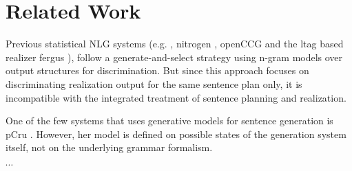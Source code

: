 \section{Related Work}
\label{sec:related}


Previous statistical NLG systems (e.g. , {\sc nitrogen} \cite{langkildeknight1998}, {\sc openCCG} \cite{whitebaldridge2003}
and the {\sc ltag} based realizer {\sc fergus} \cite{bangalorerambow2000}), follow a generate-and-select strategy using n-gram models over output structures
for discrimination. But since this approach focuses on discriminating realization output for the same sentence plan only, it is incompatible with the
integrated treatment of sentence planning and realization.

One of the few systems that uses generative models for sentence generation is {\sc pCru} \cite{belz2008}. However, her model is defined on possible states of the generation system itself, not on the underlying grammar formalism. 

$\cdots$
